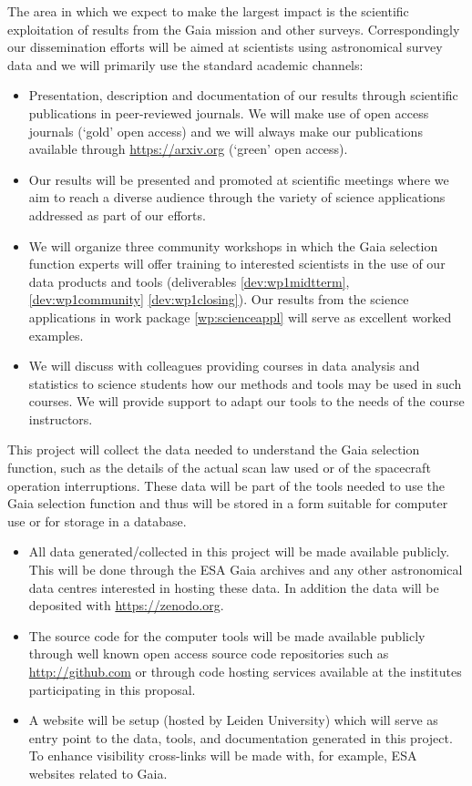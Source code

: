 The area in which we expect to make the largest impact is the scientific exploitation of results from the Gaia mission and other surveys. Correspondingly our dissemination efforts will be aimed at scientists using astronomical survey data and we will primarily use the standard academic channels:
\begin{itemize}
    \item Presentation, description and documentation of our results through scientific publications in peer-reviewed journals. We will make use of open access journals (`gold' open access) and we will always make our publications available through \url{https://arxiv.org} (`green' open access).
    \item Our results will be presented and promoted at scientific meetings where we aim to reach a diverse audience through the variety of science applications addressed as part of our efforts.
    \item We will organize three community workshops in which the Gaia selection function experts will offer training to interested scientists in the use of our data products and tools (deliverables \ref{dev:wp1midtterm}, \ref{dev:wp1community} \ref{dev:wp1closing}). Our results from the science applications in work package \ref{wp:scienceappl} will serve as excellent worked examples.
    \item We will discuss with colleagues providing courses in data analysis and statistics to science students how our methods and tools may be used in such courses. We will provide support to adapt our tools to the needs of the course instructors. 
\end{itemize}

This project will collect the data needed to understand the Gaia selection function, such as the details of the actual scan law used or of the spacecraft operation interruptions. These data will be part of the tools needed to use the Gaia selection function and thus will be stored in a form suitable for computer use or for storage in a database.
\begin{itemize}
    \item All data generated/collected in this project will be made available publicly. This will be done through the ESA Gaia archives and any other astronomical data centres interested in hosting these data. In addition the data will be deposited with \url{https://zenodo.org}.
    \item The source code for the computer tools will be made available publicly through well known open access source code repositories such as \url{http://github.com} or through code hosting services available at the institutes participating in this proposal.
    \item A website will be setup (hosted by Leiden University) which will serve as entry point to the data, tools, and documentation generated in this project. To enhance visibility cross-links will be made with, for example, ESA websites related to Gaia.
\end{itemize}


